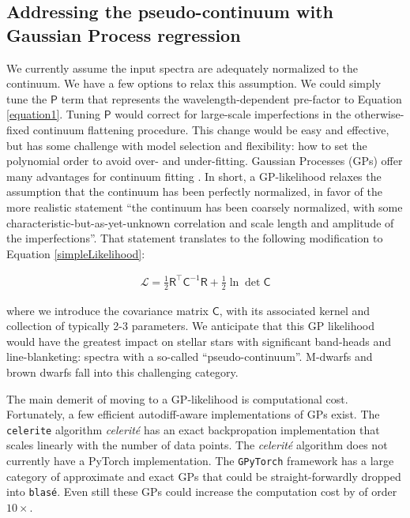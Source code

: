 \documentclass[twocolumn]{aastex631}
\begin{document}
\subsection{Addressing the pseudo-continuum with Gaussian Process regression}

We currently assume the input spectra are adequately normalized to the continuum.  We have a few options to relax this assumption.  We could  simply tune the $\mathsf{P}$ term that represents the wavelength-dependent pre-factor to Equation \ref{equation1}.  Tuning $\mathsf{P}$ would correct for large-scale imperfections in the otherwise-fixed continuum flattening procedure.  This change would be easy and effective, but has some challenge with model selection and flexibility: how to set the polynomial order to avoid over- and under-fitting.  Gaussian Processes (GPs) offer many advantages for continuum fitting \citet{czekala15}.  In short, a GP-likelihood relaxes the assumption that the continuum has been perfectly normalized, in favor of the more realistic statement ``the continuum has been coarsely normalized, with some characteristic-but-as-yet-unknown correlation and scale length and amplitude of the imperfections''.  That statement translates to the following modification to Equation \ref{simpleLikelihood}:

\begin{eqnarray}
    \mathcal{L} =  \frac{1}{2}\mathsf{R^\intercal} \mathsf{C}^{-1} \mathsf{R} +\frac{1}{2}\ln{\det{\mathsf{C}}} \label{GPLikelihood}
\end{eqnarray}

where we introduce the covariance matrix $\mathsf{C}$, with its associated kernel and collection of typically 2-3 parameters.  We anticipate that this GP likelihood would have the greatest impact on stellar stars with significant band-heads and line-blanketing: spectra with a so-called ``pseudo-continuum''.  M-dwarfs and brown dwarfs fall into this challenging category.

The main demerit of moving to a GP-likelihood is computational cost.  Fortunately, a few efficient autodiff-aware implementations of GPs exist. The \texttt{celerite} algorithm \emph{celerit\'e} \citep{2017AJ....154..220F} has an exact backpropation implementation \citep{2018RNAAS...2...31F} that scales linearly with the number of data points.  The \emph{celerit\'e} algorithm does not currently have a PyTorch implementation.  The \texttt{GPyTorch} framework \citep{2018arXiv180911165G} has a large category of approximate and exact GPs that could be straight-forwardly dropped into \texttt{blas\'e}.  Even still these GPs could increase the computation cost by of order $10\times$.
\end{document}

